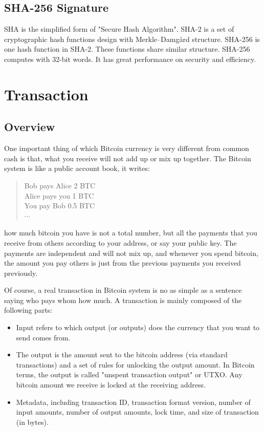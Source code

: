 \documentclass[12pt,a4paper]{article}
\begin{document}
\subsection{SHA-256 Signature}

SHA is the simplified form of "Secure Hash Algorithm". SHA-2 is a set of cryptographic hash functions design with Merkle–Damgård structure. SHA-256 is one hash function in SHA-2. These functions share similar structure. SHA-256 computes with 32-bit words. It has great performance on security and efficiency.
\section{Transaction}
\subsection{Overview}
One important thing of which Bitcoin currency is very different from common cash is that, what you receive will not add up or mix up together. The Bitcoin system is like a public account book, it writes:
\begin{quote}
Bob pays Alice 2 BTC \\
Alice pays you 1 BTC\\
You pay Bob 0.5 BTC\\
$\cdots$
\end{quote}
how much bitcoin you have is not a total number, but all the payments that you receive from others according to your address, or say your public key. The payments are independent and will not mix up, and whenever you spend bitcoin, the amount you pay others is just from the previous payments you received previously. 

Of course, a real transaction in Bitcoin system is no as simple as a sentence saying who pays whom how much. A transaction is mainly composed of the following parts:
\begin{itemize}
	\item Input refers to which output (or outputs) does the currency that you want to send comes from.
	\item The output is the amount sent to the bitcoin address (via standard transactions) and a set of rules for unlocking the output amount. In Bitcoin terms, the output is called "unspent transaction output" or UTXO. Any bitcoin amount we receive is locked at the receiving address.
	\item Metadata, including transaction ID, transaction format version, number of input amounts, number of output amounts, lock time, and size of transaction (in bytes).
\end{itemize}
\end{document}
